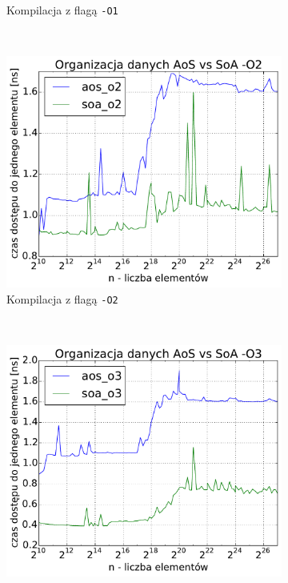 \begin{figure}
\begin{subfigure}[c]{0.45\textwidth}
        \caption{Kompilacja z flagą \texttt{-O1}}
    \end{subfigure}
    \\
    \vspace{0.55cm}
    \begin{subfigure}[c]{0.45\textwidth}
        \centering
        \includegraphics[width=\textwidth]{images/benchs/aos_vs_soa_O2}
        \caption{Kompilacja z flagą \texttt{-O2}}
    \end{subfigure}
    ~
    \begin{subfigure}[c]{0.45\textwidth}
        \centering
        \includegraphics[width=\textwidth]{images/benchs/aos_vs_soa_O3}

\end{subfigure}
\end{figure}
